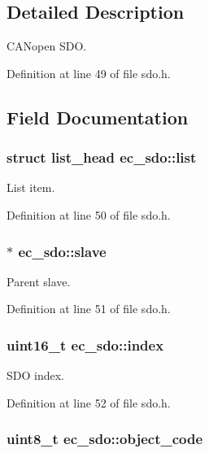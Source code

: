 \subsection{Detailed Description}
C\-A\-Nopen S\-D\-O. 

Definition at line 49 of file sdo.\-h.



\subsection{Field Documentation}
\subsubsection[{list}]{\setlength{\rightskip}{0pt plus 5cm}struct list\-\_\-head ec\-\_\-sdo\-::list}\label{structec__sdo_a19e6bd6217318c1a84191ce3bc28ebca}


List item. 



Definition at line 50 of file sdo.\-h.

\subsubsection[{slave}]{$\ast$ ec\-\_\-sdo\-::slave}\label{structec__sdo_abaa23035a820b5eaae49b95b98ef3985}


Parent slave. 



Definition at line 51 of file sdo.\-h.

\subsubsection[{index}]{\setlength{\rightskip}{0pt plus 5cm}uint16\-\_\-t ec\-\_\-sdo\-::index}\label{structec__sdo_a1764ade2d1d34c8e0c8951ff4a809663}


S\-D\-O index. 



Definition at line 52 of file sdo.\-h.

\subsubsection[{object\-\_\-code}]{\setlength{\rightskip}{0pt plus 5cm}uint8\-\_\-t ec\-\_\-sdo\-::object\-\_\-code}\label{structec__sdo_ad1e3b4f7b9d26d163289b7ab6b36b011}


